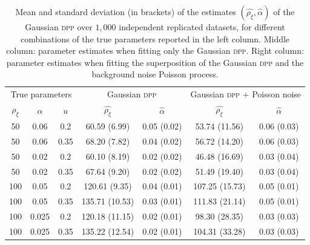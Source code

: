 \documentclass[11pt,a4paper,oneside]{article}
\theoremstyle{definition}
\theoremstyle{remark}
\begin{document}
\begin{table}
	\centering
\begin{tabular}{ccccccc}
    \multicolumn{3}{c}{True parameters} & \multicolumn{2}{c}{Gaussian \textsc{dpp}} & \multicolumn{2}{c}{Gaussian \textsc{dpp} + Poisson noise} \\
    $\rho_\xi$ & $\alpha$ & $u$ & $\hat{ \rho_\xi}$ & $\hat{\alpha}$ & $\hat{ \rho_\xi}$ & $\hat{\alpha}$ \\
    \midrule
    50 & 0.06  & 0.2  & 60.59 (6.99)  & 0.05 (0.02)  & 53.74 (11.56) & 0.06 (0.03) \\
    50 & 0.06  & 0.35 & 68.20 (7.82)  & 0.04 (0.02)  & 56.72 (14.20) & 0.06 (0.03) \\
    50 & 0.02  & 0.2  & 60.10 (8.19)  & 0.02 (0.02)  & 46.48 (16.69) & 0.03 (0.04) \\
    50 & 0.02  & 0.35 & 67.64 (9.20)  & 0.02 (0.02)  & 51.49 (19.40) & 0.03 (0.04) \\
   100 & 0.05  & 0.2  & 120.61 (9.35) & 0.04 (0.01)  & 107.25 (15.73)& 0.05 (0.01) \\
   100 & 0.05  & 0.35 & 135.71 (10.53)& 0.03 (0.01)  & 111.83 (21.14)& 0.05 (0.01) \\
   100 & 0.025 & 0.2  & 120.18 (11.15)& 0.02 (0.01)  & 98.30 (28.35) & 0.03 (0.03) \\
   100 & 0.025 & 0.35 & 135.22 (12.54)& 0.02 (0.01)  & 104.31 (33.28)& 0.03 (0.03) \\
  \end{tabular}
  \caption{Mean and standard deviation (in brackets) of the estimates  $(\hat{\rho_\xi}, \hat{\alpha})$ of the Gaussian \textsc{dpp} over $1,000$ independent replicated datasets, for different combinations of the true parameters reported in the left column. Middle column: parameter estimates when fitting only the Gaussian \textsc{dpp}. Right column: parameter estimates when fitting the superposition of the Gaussian \textsc{dpp} and the background noise Poisson process. }
	\label{tab:exp1}
\end{table}
\end{document}
